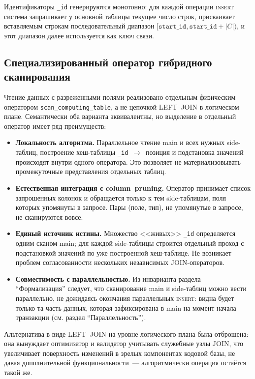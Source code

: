 Идентификаторы \texttt{\_id} генерируются монотонно: для каждой
операции \textsc{insert} система запрашивает у основной таблицы
текущее число строк, присваивает вставляемым строкам
последовательный диапазон $[\texttt{start\_id},
\texttt{start\_id}+|C|)$, и этот диапазон далее используется как
ключ связи.

\subsection{Специализированный оператор гибридного сканирования}

Чтение данных с разреженными полями реализовано отдельным физическим
оператором \texttt{scan\_computing\_table}, а не цепочкой LEFT~JOIN
в логическом плане. Семантически оба варианта эквивалентны, но
выделение в отдельный оператор имеет ряд преимуществ:

\begin{itemize}
    \item \textbf{Локальность алгоритма.} Параллельное чтение
    main и всех нужных side-таблиц, построение хеш-таблицы
    \texttt{\_id}~$\to$~позиция и подстановка значений происходят
    внутри одного оператора. Это позволяет не материализовывать
    промежуточные представления отдельных таблиц.
    \item \textbf{Естественная интеграция с column~pruning.}
    Оператор принимает список запрошенных колонок и обращается
    только к тем side-таблицам, поля которых упомянуты в запросе.
    Пары (поле, тип), не упомянутые в запросе, не сканируются
    вовсе.
    \item \textbf{Единый источник истины.} Множество <<живых>>
    \texttt{\_id} определяется одним сканом main; для каждой
    side-таблицы строится отдельный проход с подстановкой
    значений по уже построенной хеш-таблице. Не возникает
    проблем согласованности нескольких независимых
    JOIN-операторов.
    \item \textbf{Совместимость с параллельностью.} Из инварианта
    раздела ``Формализация'' следует, что сканирование main и
    side-таблиц можно вести параллельно, не дожидаясь окончания
    параллельных \textsc{insert}: видна будет только та часть
    данных, которая зафиксирована в main на момент начала
    транзакции (см. раздел ``Параллельность'').
\end{itemize}

Альтернатива в виде LEFT~JOIN на уровне логического плана была
отброшена: она вынуждает оптимизатор и валидатор учитывать
служебные узлы JOIN, что увеличивает поверхность изменений в
зрелых компонентах кодовой базы, не давая дополнительной
функциональности~--- алгоритмически операция остаётся такой же.

